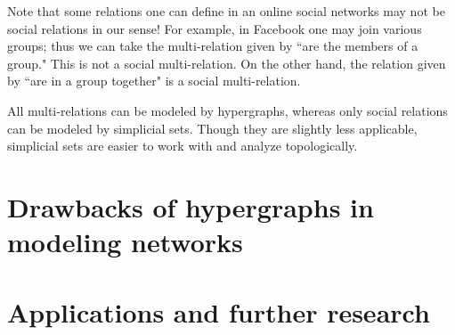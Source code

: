 \documentclass{amsart}
\begin{document}
Note that some relations one can define in an online social networks may not be social relations in our sense!  For example, in Facebook one may join various groups; thus we can take the multi-relation given by ``are the members of a group."  This is not a social multi-relation.  On the other hand, the relation given by ``are in a group together" is a social multi-relation.

All multi-relations can be modeled by hypergraphs, whereas only social relations can be modeled by simplicial sets.  Though they are slightly less applicable, simplicial sets are easier to work with and analyze topologically.  

\section{Drawbacks of hypergraphs in modeling networks}\label{sec:drawbacks}

\section{Applications and further research}\label{sec:applications}
\end{document}
